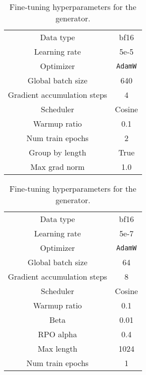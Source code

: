 \begin{table}[!ht]
    \centering
    \caption{Fine-tuning hyperparameters for the generator.}
    \begin{tabular}{c|c}
         \toprule
         Data type & bf16 \\
         Learning rate & 5e-5 \\
         Optimizer & \texttt{AdamW} \\
         Global batch size & 640 \\
         Gradient accumulation steps & 4 \\
         Scheduler & Cosine \\
         Warmup ratio & 0.1 \\
         Num train epochs & 2 \\
         Group by length & True \\
         Max grad norm & 1.0 \\
         \bottomrule
    \end{tabular}
    \label{tab:hyper-classifier}
\end{table}

\begin{table}[!ht]
    \centering
    \caption{Fine-tuning hyperparameters for the generator.}
    \begin{tabular}{c|c}
         \toprule
         Data type & bf16 \\
         Learning rate & 5e-7 \\
         Optimizer & \texttt{AdamW} \\
         Global batch size & 64 \\
         Gradient accumulation steps & 8 \\
         Scheduler & Cosine \\
         Warmup ratio & 0.1 \\
         Beta & 0.01 \\
         RPO alpha & 0.4 \\
         Max length & 1024 \\
         Num train epochs & 1 \\
         \bottomrule
    \end{tabular}
    \label{tab:hyper-generator}
\end{table}

